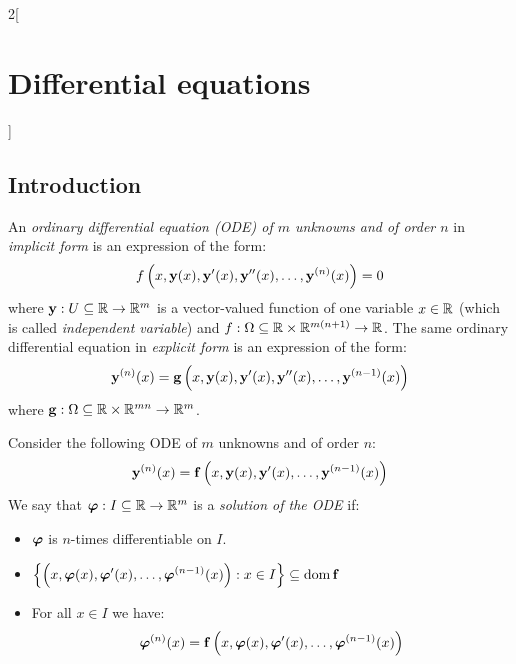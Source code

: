 \documentclass[../../../main.tex]{subfiles}
\begin{document}
\begin{multicols}{2}[\section{Differential equations}]
  \subsection{Introduction}
  \begin{definition}
    An \textit{ordinary differential equation (ODE) of $m$ unknowns and of order $n$} in \textit{implicit form} is an expression of the form: $$f\left(x,\boldsymbol{\mathrm{y}}(x),\boldsymbol{\mathrm{y}}'(x),\boldsymbol{\mathrm{y}}''(x),\ldots,\boldsymbol{\mathrm{y}}^{(n)}(x)\right)=0$$
    where $\boldsymbol{\mathrm{y}}:U\subseteq\mathbb{R}\rightarrow\mathbb{R}^m$ is a vector-valued function of one variable $x\in\mathbb{R}$ (which is called \textit{independent variable}) and $f:\Omega\subseteq\mathbb{R}\times\mathbb{R}^{m(n+1)}\rightarrow\mathbb{R}$. The same ordinary differential equation in \textit{explicit form} is an expression of the form: $$\boldsymbol{\mathrm{y}}^{(n)}(x)=\boldsymbol{\mathrm{g}}\left(x,\boldsymbol{\mathrm{y}}(x),\boldsymbol{\mathrm{y}}'(x),\boldsymbol{\mathrm{y}}''(x),\ldots,\boldsymbol{\mathrm{y}}^{(n-1)}(x)\right)$$
    where $\boldsymbol{\mathrm{g}}:\Omega\subseteq\mathbb{R}\times\mathbb{R}^{mn}\rightarrow\mathbb{R}^m$.
  \end{definition}
  \begin{definition}
    Consider the following ODE of $m$ unknowns and of order $n$:
    \begin{equation}\label{DE_ode1}
      \boldsymbol{\mathrm{y}}^{(n)}(x)=\boldsymbol{\mathrm{f}}\left(x,\boldsymbol{\mathrm{y}}(x),\boldsymbol{\mathrm{y}}'(x),\ldots,\boldsymbol{\mathrm{y}}^{(n-1)}(x)\right)
    \end{equation}
    We say that $\boldsymbol{\mathrm{\varphi}}:I\subseteq\mathbb{R}\rightarrow\mathbb{R}^m$ is a \textit{solution of the ODE} if:
    \begin{itemize}
      \item $\boldsymbol{\mathrm{\varphi}}$ is $n$-times differentiable on $I$.
      \item $\displaystyle\left\{\left(x,\boldsymbol{\mathrm{\varphi}}(x),\boldsymbol{\mathrm{\varphi}}'(x),\ldots,\boldsymbol{\mathrm{\varphi}}^{(n-1)}(x)\right):x\in I\right\}\subseteq\operatorname{dom} \boldsymbol{\mathrm{f}}$
      \item For all $x\in I$ we have:
            $$\boldsymbol{\mathrm{\varphi}}^{(n)}(x)=\boldsymbol{\mathrm{f}}\left(x,\boldsymbol{\mathrm{\varphi}}(x),\boldsymbol{\mathrm{\varphi}}'(x),\ldots,\boldsymbol{\mathrm{\varphi}}^{(n-1)}(x)\right)$$
    \end{itemize}

\end{definition}
\end{multicols}
\end{document}
